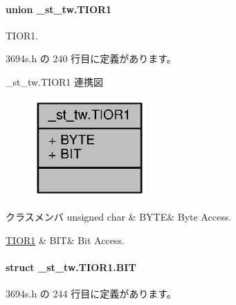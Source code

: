 \paragraph{union \+\_\+st\+\_\+tw.\+T\+I\+O\+R1}
T\+I\+O\+R1. 

 3694s.\+h の 240 行目に定義があります。



\+\_\+st\+\_\+tw.\+T\+I\+O\+R1 連携図
\nopagebreak
\begin{figure}[H]
\begin{center}
\leavevmode
\includegraphics[width=122pt]{d8/d15/union__st__tw_8TIOR1__coll__graph}
\end{center}
\end{figure}
\begin{DoxyFields}{クラスメンバ}
unsigned char\label{3694s_8h_ae409eb2ba6eb6801f52763ae370c350e}
&
B\+Y\+T\+E&
Byte Access. \\
\hline

\hyperlink{3694s_8h_d7/dd2/struct__st__tw_8TIOR1_8BIT}{T\+I\+O\+R1}\label{3694s_8h_adb957fdc8000e1eef04a243f5199aa52}
&
B\+I\+T&
Bit Access. \\
\hline

\end{DoxyFields}
\label{struct__st__tw_8TIOR1_8BIT}
\paragraph{struct \+\_\+st\+\_\+tw.\+T\+I\+O\+R1.\+B\+I\+T}


 3694s.\+h の 244 行目に定義があります。



